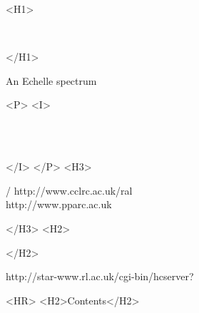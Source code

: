 \begin{htmlonly}
   \xlabel{}
   \begin{rawhtml} <H1> \end{rawhtml}
      \stardoctitle\\
   \begin{rawhtml} </H1> \end{rawhtml}

   \begin{figure}[h]
   \epsfysize=120mm
   \end{figure}

   An Echelle spectrum

   \begin{rawhtml} <P> <I> \end{rawhtml}
   \stardoccategory \stardocnumber \\
   \stardocauthors \\
   \stardocdate
   \begin{rawhtml} </I> </P> <H3> \end{rawhtml}
       /
                        {http://www.cclrc.ac.uk/ral} \\
                        {http://www.pparc.ac.uk} \\
   \begin{rawhtml} </H3> <H2> \end{rawhtml}
   \begin{rawhtml} </H2> \end{rawhtml}
      {http://star-www.rl.ac.uk/cgi-bin/hcserver?\stardocsource}\\

  \label{stardoccontents}
  \begin{rawhtml}
    <HR>
    <H2>Contents</H2>
  \end{rawhtml}
  \newcommand{\latexonlytoc}[0]{}

\end{htmlonly}

